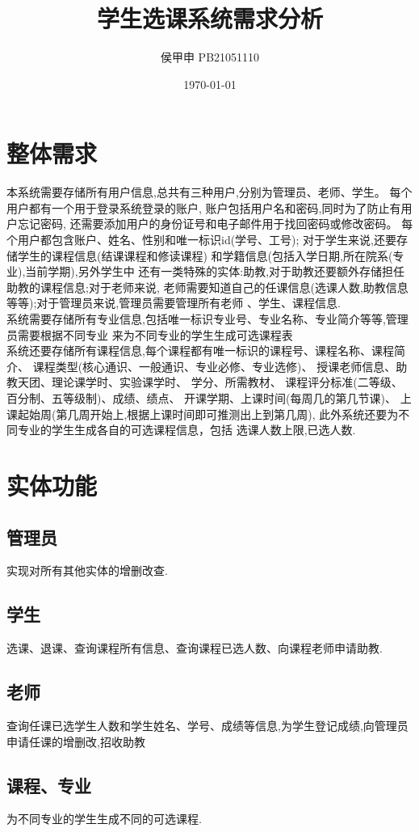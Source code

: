 \documentclass{article}
\title{ \textbf{学生选课系统需求分析}}
\author{侯甲申 PB21051110}
\date{\today}
\begin{document}
\maketitle
\tableofcontents
\section{整体需求}
本系统需要存储所有用户信息,总共有三种用户,分别为管理员、老师、学生。
每个用户都有一个用于登录系统登录的账户,
账户包括用户名和密码,同时为了防止有用户忘记密码,
还需要添加用户的身份证号和电子邮件用于找回密码或修改密码。
每个用户都包含账户、姓名、性别和唯一标识id(学号、工号);
对于学生来说,还要存储学生的课程信息(结课课程和修读课程)
和学籍信息(包括入学日期,所在院系(专业),当前学期),另外学生中
还有一类特殊的实体:助教,对于助教还要额外存储担任助教的课程信息;对于老师来说,
老师需要知道自己的任课信息(选课人数,助教信息等等);对于管理员来说,管理员需要管理所有老师
、学生、课程信息.\\
系统需要存储所有专业信息,包括唯一标识专业号、专业名称、专业简介等等,管理员需要根据不同专业
来为不同专业的学生生成可选课程表
\\
系统还要存储所有课程信息,每个课程都有唯一标识的课程号、课程名称、课程简介、
课程类型(核心通识、一般通识、专业必修、专业选修)、
授课老师信息、助教天团、理论课学时、实验课学时、
学分、所需教材、
课程评分标准(二等级、百分制、五等级制)、成绩、绩点、
开课学期、上课时间(每周几的第几节课)、
上课起始周(第几周开始上,根据上课时间即可推测出上到第几周),
此外系统还要为不同专业的学生生成各自的可选课程信息，包括
选课人数上限,已选人数.
\section{实体功能}
\subsection{管理员}
实现对所有其他实体的增删改查.
\subsection{学生}
选课、退课、查询课程所有信息、查询课程已选人数、向课程老师申请助教.
\subsection{老师}
查询任课已选学生人数和学生姓名、学号、成绩等信息,为学生登记成绩,向管理员申请任课的增删改,招收助教
\subsection{课程、专业}
为不同专业的学生生成不同的可选课程.
\end{document}
